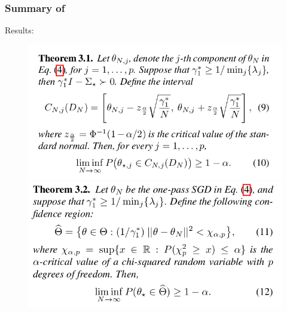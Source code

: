 \documentclass{beamer}
\begin{document}
\begin{frame}
  \frametitle{Summary of~\citet{chee:2023}}
  Results:
  \begin{figure}[h!]
    \centering
    \includegraphics[scale=0.25]{31.png}
    \includegraphics[scale=0.25]{32.png}
  \end{figure}
\end{frame}
\end{document}
